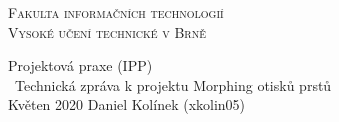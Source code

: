 \documentclass[a4paper,11pt]{article}
\begin{document}
\begin{titlepage}
\begin{center}
\Huge
\textsc{Fakulta informačních technologií\\
Vysoké učení technické v Brně}\\
		\begin{figure}[ht]
		    
			\centering
		\end{figure}
\LARGE Projektová praxe (IPP) \\\
Technická zpráva k projektu Morphing otisků prstů\\
\Large Květen 2020 \hfill Daniel Kolínek (xkolin05) \newpage
\end{center}
\end{titlepage}
\end{document}
